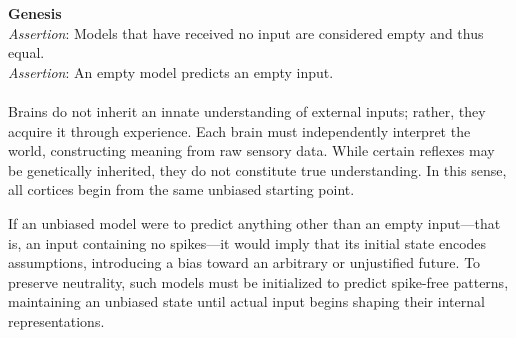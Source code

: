 \documentclass{article}
\newcommand{\agitbtest}[2]{
  \item
  \begin{minipage}[t]{\linewidth}
    \textbf{#1} \\[0.5ex]
    #2
  \end{minipage}
}
\begin{document}
\begin{agitblist}
\agitbtest{Genesis}{
\emph{Assertion}: Models that have received no input are considered empty and thus equal.\\
\emph{Assertion}: An empty model predicts an empty input.\\
\\
Brains do not inherit an innate understanding of external inputs; rather, they acquire it through experience. Each brain must independently interpret the world, constructing meaning from raw sensory data. While certain reflexes may be genetically inherited, they do not constitute true understanding. In this sense, all cortices begin from the same unbiased starting point.

If an unbiased model were to predict anything other than an empty input—that is, an input containing no spikes—it would imply that its initial state encodes assumptions, introducing a bias toward an arbitrary or unjustified future. To preserve neutrality, such models must be initialized to predict spike-free patterns, maintaining an unbiased state until actual input begins shaping their internal representations.

}
\end{agitblist}
\end{document}
